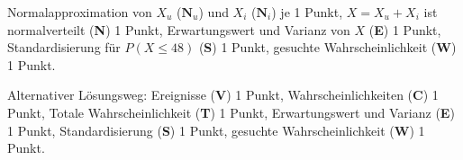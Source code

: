 \begin{bewertung}
Normalapproximation von $X_u$ ($\textbf{N}_u$) und $X_i$ ($\textbf{N}_i$)
je 1 Punkt,
$X=X_u+X_i$ ist normalverteilt ({\bf N}) 1 Punkt,
Erwartungswert und Varianz von $X$ ({\bf E}) 1 Punkt,
Standardisierung für $P(X\le 48)$ ({\bf S}) 1 Punkt,
gesuchte Wahrscheinlichkeit ({\bf W}) 1 Punkt.

Alternativer Lösungsweg: Ereignisse ({\bf V}) 1 Punkt,
Wahrscheinlichkeiten ({\bf C}) 1 Punkt,
Totale Wahrscheinlichkeit ({\bf T}) 1 Punkt,
Erwartungswert und Varianz ({\bf E}) 1 Punkt,
Standardisierung ({\bf S}) 1 Punkt,
gesuchte Wahrscheinlichkeit ({\bf W}) 1 Punkt.
\end{bewertung}

